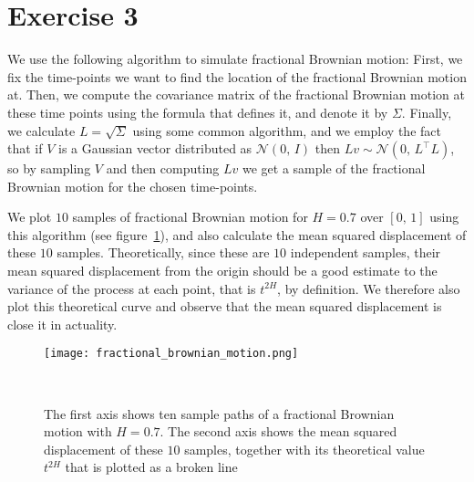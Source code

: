 \documentclass{amsart}
\theoremstyle{plain}
\theoremstyle{definition}
\theoremstyle{definition}
\theoremstyle{remark}
\begin{document}
\section{Exercise 3}
We use the following algorithm to simulate fractional Brownian motion: First, we fix the time-points we want to find the location of the fractional Brownian motion at. Then, we compute the covariance matrix of the fractional Brownian motion at these time points using the formula that defines it, and denote it by \(\Sigma\). Finally, we calculate \(L = \sqrt{\Sigma}\) using some common algorithm, and we employ the fact that if \(V\) is a Gaussian vector distributed as
\(\mathcal{N}\left(0,\,I\right)\) then \(Lv \sim \mathcal{N}\left(0,\,L^{\top}L\right)\), so by sampling \(V\) and then computing \(Lv\) we get a sample of the fractional Brownian motion for the chosen time-points.

We plot \(10\) samples of fractional Brownian motion for \(H=0.7\) over \(\left[0,\,1\right]\) using this algorithm (see figure~\ref{fig:fractional-brownian-motion}), and also calculate the mean squared displacement of these \(10\) samples. Theoretically, since these are \(10\) independent samples, their mean squared displacement from the origin should be a good estimate to the variance of the process at each point, that is \(t^{2H}\), by definition. We therefore also plot this theoretical curve and
observe that the mean squared displacement is close it in actuality.


\begin{figure}
    \texttt{[image: fractional\_brownian\_motion.png]}
    \caption{The first axis shows ten sample paths of a fractional Brownian motion with \(H=0.7\). The second axis shows the mean squared displacement of these \(10\) samples, together with its theoretical value \(t^{2H}\) that is plotted as a broken line}~\label{fig:fractional-brownian-motion}
\end{figure}
\end{document}
